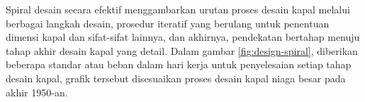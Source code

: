 Spiral desain secara efektif menggambarkan urutan proses desain kapal melalui berbagai langkah desain, prosedur iteratif yang berulang untuk penentuan dimensi kapal dan sifat-sifat lainnya, dan akhirnya, pendekatan bertahap menuju tahap akhir desain kapal yang detail. Dalam gambar \ref{fig:design-spiral}, diberikan beberapa standar atau beban dalam hari kerja untuk penyelesaian setiap tahap desain kapal, grafik tersebut disesuaikan proses desain kapal niaga besar pada akhir 1950-an.


